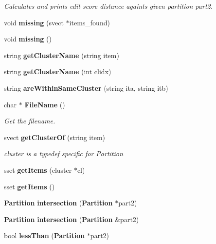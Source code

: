 \begin{CompactItemize}
\begin{CompactList}\small\item\em Calculates and prints edit score distance againts given partition part2. \item\end{CompactList}\item 
void {\bf missing} (svect $\ast$items\_\-found)\label{classPartition_a21}

\item 
void {\bf missing} ()\label{classPartition_a22}

\item 
string {\bf get\-Cluster\-Name} (string item)\label{classPartition_a23}

\item 
string {\bf get\-Cluster\-Name} (int clidx)\label{classPartition_a24}

\item 
string {\bf are\-Within\-Same\-Cluster} (string ita, string itb)\label{classPartition_a25}

\item 
char $\ast$ {\bf File\-Name} ()\label{classPartition_a26}

\begin{CompactList}\small\item\em Get the filename. \item\end{CompactList}\item 
svect {\bf get\-Cluster\-Of} (string item)\label{classPartition_a27}

\begin{CompactList}\small\item\em cluster is a typedef specific for Partition \item\end{CompactList}\item 
sset {\bf get\-Items} (cluster $\ast$cl)\label{classPartition_a28}

\item 
sset {\bf get\-Items} ()\label{classPartition_a29}

\item 
{\bf Partition} {\bf intersection} ({\bf Partition} $\ast$part2)
\item 
{\bf Partition} {\bf intersection} ({\bf Partition} \&part2)\label{classPartition_a31}

\item 
bool {\bf less\-Than} ({\bf Partition} $\ast$part2)\label{classPartition_a32}


\end{CompactItemize}
